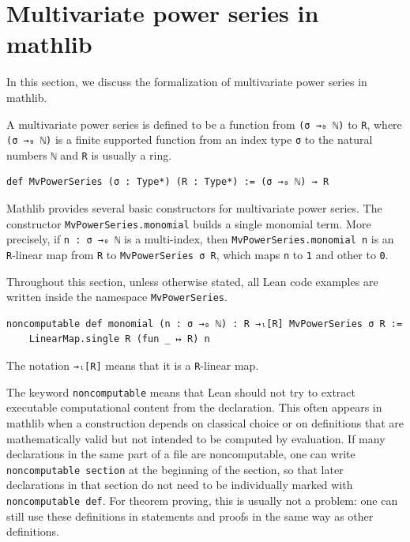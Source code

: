 \section{Multivariate power series in mathlib}
\label{sec:mvpowerseries}

In this section, we discuss the formalization of multivariate power series in mathlib.

A multivariate power series is defined to be a function from
\lstinline|(σ →₀ ℕ)| to \lstinline|R|, where \lstinline|(σ →₀ ℕ)| is a
finite supported function from an index type \lstinline|σ| to the natural numbers
\lstinline|ℕ| and \lstinline|R| is usually a ring.

\begin{lstlisting}
def MvPowerSeries (σ : Type*) (R : Type*) := (σ →₀ ℕ) → R
\end{lstlisting}

Mathlib provides several basic constructors for multivariate power
series.  The constructor \lstinline|MvPowerSeries.monomial|
\href{https://leanprover-community.github.io/mathlib4_docs/Mathlib/RingTheory/MvPowerSeries/Basic.html#MvPowerSeries.monomial}{\faExternalLink}
builds a single monomial term.  More precisely, if \lstinline|n : σ →₀ ℕ| is a
multi-index, then \lstinline|MvPowerSeries.monomial n| is an
\lstinline|R|-linear map from \lstinline|R| to
\lstinline|MvPowerSeries σ R|, which maps \lstinline|n| to \lstinline|1| and other to
\lstinline|0|.

Throughout this section, unless otherwise stated, all Lean code examples
are written inside the namespace \lstinline|MvPowerSeries|.

\begin{lstlisting}
noncomputable def monomial (n : σ →₀ ℕ) : R →ₗ[R] MvPowerSeries σ R :=
    LinearMap.single R (fun _ ↦ R) n
\end{lstlisting}

The notation \lstinline|→ₗ[R]| means that it is a \lstinline|R|-linear map.

The keyword \lstinline|noncomputable| means that Lean should not try to
extract executable computational content from the declaration.  This
often appears in mathlib when a construction depends on classical choice
or on definitions that are mathematically valid but not intended to be
computed by evaluation.  If many declarations in the same part of a file
are noncomputable, one can write \lstinline|noncomputable section| at the
beginning of the section, so that later declarations in that section do
not need to be individually marked with \lstinline|noncomputable def|.
For theorem proving, this is usually not a problem: one can still use
these definitions in statements and proofs in the same way as other
definitions.

